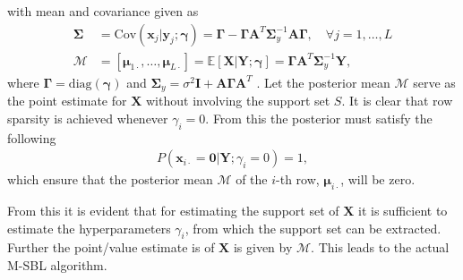 with mean and covariance given as
\begin{align}
\boldsymbol{\Sigma} &= \text{Cov}(\mathbf{x}_{j} \vert \mathbf{y}_{j} ; \boldsymbol{\gamma}) = \boldsymbol{\Gamma} - \boldsymbol{\Gamma} \mathbf{A}^T \boldsymbol{\Sigma}_y^{-1} \mathbf{A} \boldsymbol{\Gamma}, \quad \forall j = 1, \dots, L \nonumber \\
\mathcal{M} &= [\boldsymbol{\mu}_{1 \cdot}, \dots, \boldsymbol{\mu}_{ L \cdot}] = \mathbb{E}[\mathbf{X} \vert \mathbf{Y} ; \boldsymbol{\gamma}] = \boldsymbol{\Gamma} \mathbf{A}^T \boldsymbol{\Sigma}_y^{-1} \mathbf{Y}, \label{eq:moments}
\end{align}
where $\boldsymbol{\Gamma} = \text{diag}(\boldsymbol{\gamma})$ and $\boldsymbol{\Sigma}_y = \sigma^2 \mathbf{I} + \mathbf{A} \boldsymbol{\Gamma} \mathbf{A}^T$ . 
Let the posterior mean $\mathcal{M}$ serve as the point estimate for $\mathbf{X}$ without involving the support set $S$.
It is clear that row sparsity is achieved whenever $\gamma_i = 0$. 
From this the posterior must satisfy the following 
\begin{align*}
P(\mathbf{x}_{i \cdot} = \mathbf{0} \vert \mathbf{Y} ; \gamma_i = 0) = 1,
\end{align*}
which ensure that the posterior mean $\mathcal{M}$ of the $i$-th row, $\boldsymbol{\mu}_{i \cdot}$, will be zero.

From this it is evident that for estimating the support set of $\textbf{X}$ it is sufficient to estimate the hyperparameters $\gamma_i$, from which the support set can be extracted. Further the point/value estimate is of $\textbf{X}$ is given by $\mathcal{M}$\cite[p. 147/21?]{phd_wipf}. 
This leads to the actual M-SBL algorithm.

